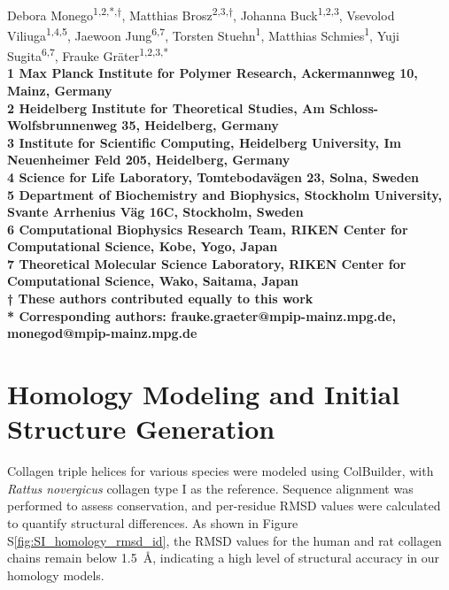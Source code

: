 \documentclass[10pt,letterpaper]{article}
\begin{document}
\vspace*{0.35in}

\begin{flushleft}
{\Large
\textbf{}
}
\newline
\\
Debora Monego\textsuperscript{1,2,*,†},
Matthias Brosz\textsuperscript{2,3,†},
Johanna Buck\textsuperscript{1,2,3},
Vsevolod Viliuga\textsuperscript{1,4,5},
Jaewoon Jung\textsuperscript{6,7},
Torsten Stuehn\textsuperscript{1},
Matthias Schmies\textsuperscript{1},
Yuji Sugita\textsuperscript{6,7},
Frauke Gr\"ater\textsuperscript{1,2,3,*}
\\
\bigskip
\bf{1} Max Planck Institute for Polymer Research, Ackermannweg 10, Mainz, Germany
\\
\bf{2} Heidelberg Institute for Theoretical Studies, Am Schloss-Wolfsbrunnenweg 35, Heidelberg, Germany
\\
\bf{3} Institute for Scientific Computing, Heidelberg University, Im Neuenheimer Feld 205, Heidelberg, Germany
\\
\bf{4} Science for Life Laboratory, Tomtebodavägen 23, Solna, Sweden
\\
\bf{5} Department of Biochemistry and Biophysics, Stockholm University, Svante Arrhenius Väg 16C, Stockholm, Sweden
\\
\bf{6} Computational Biophysics Research Team, RIKEN Center for Computational Science, Kobe, Yogo, Japan
\\
\bf{7} Theoretical Molecular Science Laboratory, RIKEN Center for Computational Science, Wako, Saitama, Japan
\\
\bigskip
† These authors contributed equally to this work
\\
* Corresponding authors: frauke.graeter@mpip-mainz.mpg.de, monegod@mpip-mainz.mpg.de

\end{flushleft}

\justifying

\section*{Homology Modeling and Initial Structure Generation}

Collagen triple helices for various species were modeled using ColBuilder, with \textit{Rattus novergicus} collagen type I as the reference. Sequence alignment was performed to assess conservation, and per-residue RMSD values were calculated to quantify structural differences. As shown in Figure S\ref{fig:SI_homology_rmsd_id}, the RMSD values for the human and rat collagen chains remain below \SI{1.5}{\angstrom}, indicating a high level of structural accuracy in our homology models.
\end{document}
